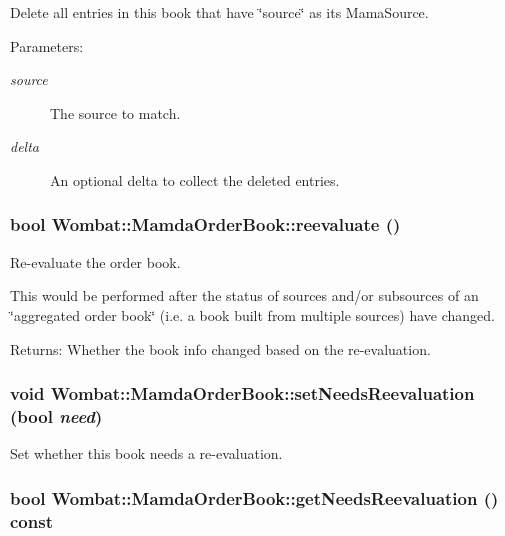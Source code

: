 Delete all entries in this book that have \char`\"{}source\char`\"{} as its Mama\-Source. 

\begin{Desc}
\item[Parameters:]
\begin{description}
\item[{\em source}]The source to match. \item[{\em delta}]An optional delta to collect the deleted entries. \end{description}
\end{Desc}
\hypertarget{classWombat_1_1MamdaOrderBook_3e3bf06096ebc9a847bd72274fec13df}{
\subsubsection[reevaluate]{\setlength{\rightskip}{0pt plus 5cm}bool Wombat::Mamda\-Order\-Book::reevaluate ()}}
\label{classWombat_1_1MamdaOrderBook_3e3bf06096ebc9a847bd72274fec13df}


Re-evaluate the order book. 

This would be performed after the status of sources and/or subsources of an \char`\"{}aggregated order book\char`\"{} (i.e. a book built from multiple sources) have changed.

\begin{Desc}
\item[Returns:]Whether the book info changed based on the re-evaluation. \end{Desc}
\hypertarget{classWombat_1_1MamdaOrderBook_8431faa01427b17fc25efa1745c7a006}{
\subsubsection[setNeedsReevaluation]{\setlength{\rightskip}{0pt plus 5cm}void Wombat::Mamda\-Order\-Book::set\-Needs\-Reevaluation (bool {\em need})}}
\label{classWombat_1_1MamdaOrderBook_8431faa01427b17fc25efa1745c7a006}


Set whether this book needs a re-evaluation. 

\hypertarget{classWombat_1_1MamdaOrderBook_70f8d27116c1cf0cecb2ed088d46cc31}{
\subsubsection[getNeedsReevaluation]{\setlength{\rightskip}{0pt plus 5cm}bool Wombat::Mamda\-Order\-Book::get\-Needs\-Reevaluation () const}}
\label{classWombat_1_1MamdaOrderBook_70f8d27116c1cf0cecb2ed088d46cc31}


